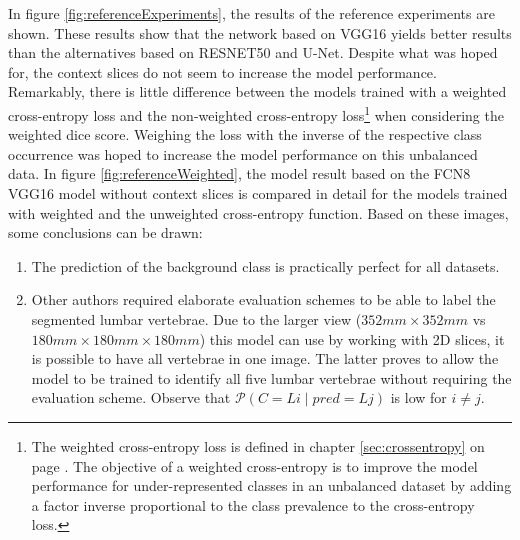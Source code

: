 \par{
    In figure \ref{fig:referenceExperiments}, the results of the reference experiments are shown.
    These results show that the network based on VGG16 yields better results than the alternatives based on RESNET50 and U-Net.
    Despite what was hoped for, the context slices do not seem to increase the model performance.
    Remarkably, there is little difference between the models trained with a weighted cross-entropy loss and the non-weighted cross-entropy loss\footnote{
        The weighted cross-entropy loss is defined in chapter \ref{sec:crossentropy} on page \pageref{sec:crossentropy}. 
        The objective of a weighted cross-entropy is to improve the model performance for under-represented classes in an unbalanced dataset by adding a factor inverse proportional to the class prevalence to the cross-entropy loss.
    } when considering the weighted dice score.
    Weighing the loss with the inverse of the respective class occurrence was hoped to increase the model performance on this unbalanced data.
    In figure \ref{fig:referenceWeighted}, the model result based on the FCN8 VGG16 model without context slices is compared in detail for the models trained with weighted and the unweighted cross-entropy function.
    Based on these images, some conclusions can be drawn:
    \begin{enumerate}
        \item The prediction of the background class is practically perfect for all datasets.
        \item Other authors \cite{Lessmann2018,Chuang2019} required elaborate evaluation schemes to be able to label the segmented lumbar vertebrae. 
        Due to the larger view ($352 mm \times 352 mm$ vs $180 mm \times 180 mm \times 180 mm$) this model can use by working with 2D slices, it is possible to have all vertebrae in one image.
        The latter proves to allow the model to be trained to identify all five lumbar vertebrae without requiring the evaluation scheme.
        Observe that $\mathcal{P}(C = Li \mid pred = Lj)$ is low for $i\neq j$.
    \end{enumerate}
}

